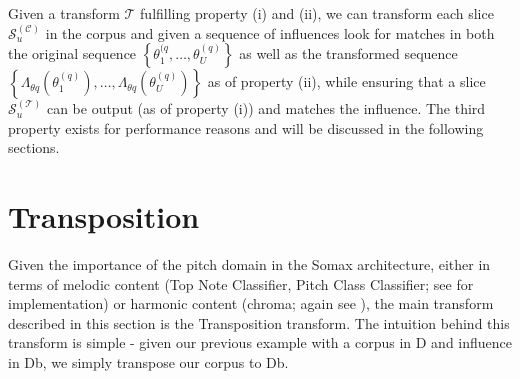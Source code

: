 \noindent Given a transform $\mathcal T$ fulfilling property (i) and (ii), we can transform each slice $\mathcal S^{(\mathcal C)}_u$ in the corpus and given a sequence of influences look for matches in both the original sequence $\left\lbrace \theta^{(q}_1, \dots, \theta^{(q)}_U\right\rbrace$ as well as the transformed sequence $\left\lbrace \Lambda_{\theta q} \left(\theta^{(q)}_1 \right), \dots, \Lambda_{\theta q} \left(\theta^{(q)}_U \right)\right\rbrace$ as of property (ii), while ensuring that a slice $\mathcal S^{(\mathcal T)}_u$ can be output (as of property (i)) and matches the influence. 
	The third property exists for performance reasons and will be discussed in the following sections.

\section{Transposition}\label{ssec:transposition}
Given the importance of the pitch domain in the Somax architecture, either in terms of melodic content (Top Note Classifier, Pitch Class Classifier; see \cite{somaxsoftware2021} for implementation) or harmonic content (chroma; again see \cite{somaxsoftware2021}), the main transform described in this section is the Transposition transform. The intuition behind this transform is simple - given our previous example with a corpus in D and influence in Db, we simply transpose our corpus to Db. 

